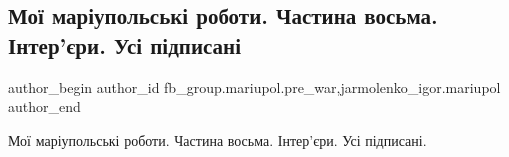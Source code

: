  
 
 
 
 

\subsection{Мої маріупольські роботи. Частина восьма. Інтер'єри. Усі підписані}
\label{sec:18_02_2023.fb.fb_group.mariupol.pre_war.2.mo__mar_upolsk__robo}
 
\ifcmt
 author_begin
   author_id fb_group.mariupol.pre_war,jarmolenko_igor.mariupol
 author_end
\fi

Мої маріупольські роботи. Частина восьма. Інтер'єри. Усі підписані.

